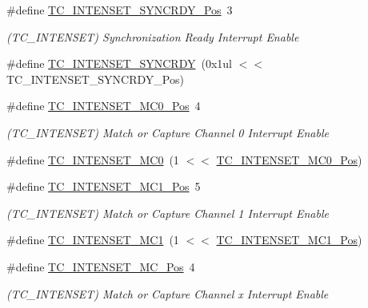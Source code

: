 \begin{DoxyCompactItemize}
\item 
\#define \mbox{\hyperlink{group___s_a_m_d21___t_c_gad69d7d4971a0002c4efd1aa434c84f61}{T\+C\+\_\+\+I\+N\+T\+E\+N\+S\+E\+T\+\_\+\+S\+Y\+N\+C\+R\+D\+Y\+\_\+\+Pos}}~3
\begin{DoxyCompactList}\small\item\em (T\+C\+\_\+\+I\+N\+T\+E\+N\+S\+ET) Synchronization Ready Interrupt Enable \end{DoxyCompactList}\item 
\#define \mbox{\hyperlink{group___s_a_m_d21___t_c_ga5bcf70f15b7a0638e6430bdb01acf03f}{T\+C\+\_\+\+I\+N\+T\+E\+N\+S\+E\+T\+\_\+\+S\+Y\+N\+C\+R\+DY}}~(0x1ul $<$$<$ T\+C\+\_\+\+I\+N\+T\+E\+N\+S\+E\+T\+\_\+\+S\+Y\+N\+C\+R\+D\+Y\+\_\+\+Pos)
\item 
\#define \mbox{\hyperlink{group___s_a_m_d21___t_c_gaeb76aeead8335324a610dabc36f7edea}{T\+C\+\_\+\+I\+N\+T\+E\+N\+S\+E\+T\+\_\+\+M\+C0\+\_\+\+Pos}}~4
\begin{DoxyCompactList}\small\item\em (T\+C\+\_\+\+I\+N\+T\+E\+N\+S\+ET) Match or Capture Channel 0 Interrupt Enable \end{DoxyCompactList}\item 
\#define \mbox{\hyperlink{group___s_a_m_d21___t_c_gaa097fc56a041e1a17e2e1974a693fe59}{T\+C\+\_\+\+I\+N\+T\+E\+N\+S\+E\+T\+\_\+\+M\+C0}}~(1 $<$$<$ \mbox{\hyperlink{group___s_a_m_d21___t_c_gaeb76aeead8335324a610dabc36f7edea}{T\+C\+\_\+\+I\+N\+T\+E\+N\+S\+E\+T\+\_\+\+M\+C0\+\_\+\+Pos}})
\item 
\#define \mbox{\hyperlink{group___s_a_m_d21___t_c_ga51ae14dbca405d41cd83d9588d662bf1}{T\+C\+\_\+\+I\+N\+T\+E\+N\+S\+E\+T\+\_\+\+M\+C1\+\_\+\+Pos}}~5
\begin{DoxyCompactList}\small\item\em (T\+C\+\_\+\+I\+N\+T\+E\+N\+S\+ET) Match or Capture Channel 1 Interrupt Enable \end{DoxyCompactList}\item 
\#define \mbox{\hyperlink{group___s_a_m_d21___t_c_gad8e1e2b456e4f231da82f48054c8ff60}{T\+C\+\_\+\+I\+N\+T\+E\+N\+S\+E\+T\+\_\+\+M\+C1}}~(1 $<$$<$ \mbox{\hyperlink{group___s_a_m_d21___t_c_ga51ae14dbca405d41cd83d9588d662bf1}{T\+C\+\_\+\+I\+N\+T\+E\+N\+S\+E\+T\+\_\+\+M\+C1\+\_\+\+Pos}})
\item 
\#define \mbox{\hyperlink{group___s_a_m_d21___t_c_ga0affd52c9cb86de0f284a9076745e992}{T\+C\+\_\+\+I\+N\+T\+E\+N\+S\+E\+T\+\_\+\+M\+C\+\_\+\+Pos}}~4
\begin{DoxyCompactList}\small\item\em (T\+C\+\_\+\+I\+N\+T\+E\+N\+S\+ET) Match or Capture Channel x Interrupt Enable \end{DoxyCompactList}\item 
$$
\end{DoxyCompactItemize}

